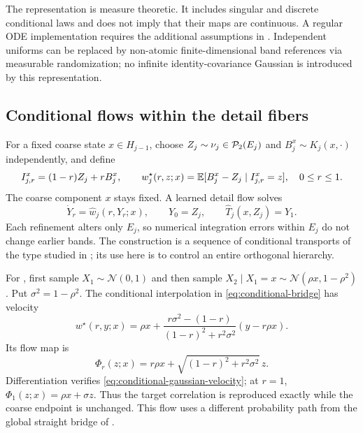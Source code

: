 The representation is measure theoretic. It includes singular and discrete conditional laws and does not imply that their maps are continuous. A regular ODE implementation requires the additional assumptions in . Independent uniforms can be replaced by non-atomic finite-dimensional band references via measurable randomization; no infinite identity-covariance Gaussian is introduced by this representation.

\subsection{Conditional flows within the detail fibers}
For a fixed coarse state $x\in H_{j-1}$, choose $Z_j\sim\nu_j\in\mathcal P_2(E_j)$ and $B_j^x\sim K_j(x,\cdot)$ independently, and define
\begin{equation}\label{eq:conditional-bridge}
 I^x_{j,r}=(1-r)Z_j+rB_j^x,\qquad
 w_j^\star(r,z;x)=\mathbb E[B_j^x-Z_j\mid I^x_{j,r}=z],\quad 0\le r\le1.
\end{equation}
The coarse component $x$ stays fixed. A learned detail flow solves
\begin{equation}\label{eq:detail-ode}
 \dot Y_r=\widehat w_j(r,Y_r;x),\qquad Y_0=Z_j,
 \qquad \widehat T_j(x,Z_j)=Y_1.
\end{equation}
Each refinement alters only $E_j$, so numerical integration errors within $E_j$ do not change earlier bands. The construction is a sequence of conditional transports of the type studied in \citet{hosseini2025,kerrigan2024conditional}; its use here is to control an entire orthogonal hierarchy.

For , first sample $X_1\sim\mathcal N(0,1)$ and then sample $X_2\mid X_1=x\sim\mathcal N(\rho x,1-\rho^2)$. Put $\sigma^2=1-\rho^2$. The conditional interpolation in \eqref{eq:conditional-bridge} has velocity
\begin{equation}\label{eq:conditional-gaussian-velocity}
 w^\star(r,y;x)=\rho x+
 \frac{r\sigma^2-(1-r)}{(1-r)^2+r^2\sigma^2}(y-r\rho x).
\end{equation}
Its flow map is
\begin{equation}\label{eq:conditional-gaussian-map}
 \Phi_r(z;x)=r\rho x+\sqrt{(1-r)^2+r^2\sigma^2}\,z.
\end{equation}
Differentiation verifies \eqref{eq:conditional-gaussian-velocity}; at $r=1$, $\Phi_1(z;x)=\rho x+\sigma z$. Thus the target correlation is reproduced exactly while the coarse endpoint is unchanged. This flow uses a different probability path from the global straight bridge of .

